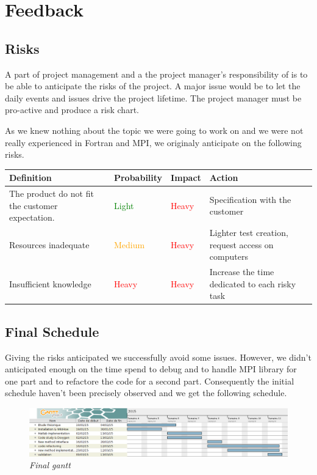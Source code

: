 \section{Feedback}
\subsection{Risks}
 A part of project management and a the project manager's responsibility of is to be able to anticipate the risks of the project. A major issue would be to let the daily events and issues drive the project lifetime. The project manager must be pro-active and produce a risk chart.

As we knew nothing about the topic we were going to work on and we were not really experienced in Fortran and MPI, we originaly anticipate on the following risks.
\begin{center}
\begin{tabular}{ | p{} |  p{} |  p{} |  p{}|}
\hline
\textbf{Definition} & \textbf{Probability} & \textbf{Impact} & \textbf{Action}
\\

\hline
The product do not fit the customer expectation. &
\textcolor{green}{Light} &
\textcolor{red}{Heavy} &
Specification with the customer \\

\hline
Resources inadequate &
\textcolor{orange}{Medium} &
\textcolor{red}{Heavy} &
Lighter test creation, request access on computers \\

\hline
Insufficient knowledge &
\textcolor{red}{Heavy} &
\textcolor{red}{Heavy} &
Increase the time dedicated to each risky task \\
\hline
\end{tabular}
\end{center}

\subsection{Final Schedule}

Giving the risks anticipated we successfully avoid some issues. However, we didn't anticipated enough on the time spend to debug and to handle MPI library for one part and to refactore the code for a second part. Consequently the initial schedule haven't been precisely observed and we get the following schedule. \\

\begin{figure}[h!]
\includegraphics[width=1\textwidth]{Image/gantt2.png}\centering
\caption{\textit{Final gantt}}
\end{figure}

